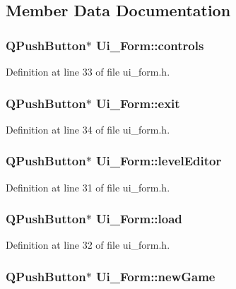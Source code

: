 \subsection{Member Data Documentation}
\hypertarget{class_ui___form_a651e4b874f7a2909163b716c44d00ac9}{
\subsubsection[{controls}]{\setlength{\rightskip}{0pt plus 5cm}QPushButton$\ast$ {\bf Ui\_\-Form::controls}}}
\label{class_ui___form_a651e4b874f7a2909163b716c44d00ac9}


Definition at line 33 of file ui\_\-form.h.\hypertarget{class_ui___form_a57a600065f00f810f6aca67828566765}{
\subsubsection[{exit}]{\setlength{\rightskip}{0pt plus 5cm}QPushButton$\ast$ {\bf Ui\_\-Form::exit}}}
\label{class_ui___form_a57a600065f00f810f6aca67828566765}


Definition at line 34 of file ui\_\-form.h.\hypertarget{class_ui___form_aa3264d09b92887101ecdc97a9d062ece}{
\subsubsection[{levelEditor}]{\setlength{\rightskip}{0pt plus 5cm}QPushButton$\ast$ {\bf Ui\_\-Form::levelEditor}}}
\label{class_ui___form_aa3264d09b92887101ecdc97a9d062ece}


Definition at line 31 of file ui\_\-form.h.\hypertarget{class_ui___form_ae31e79a3a60f1e4995010ddc8b7dcff3}{
\subsubsection[{load}]{\setlength{\rightskip}{0pt plus 5cm}QPushButton$\ast$ {\bf Ui\_\-Form::load}}}
\label{class_ui___form_ae31e79a3a60f1e4995010ddc8b7dcff3}


Definition at line 32 of file ui\_\-form.h.\hypertarget{class_ui___form_ae5ee8b7efe421103b41d2e290a3e5098}{
\subsubsection[{newGame}]{\setlength{\rightskip}{0pt plus 5cm}QPushButton$\ast$ {\bf Ui\_\-Form::newGame}}}
\label{class_ui___form_ae5ee8b7efe421103b41d2e290a3e5098}


